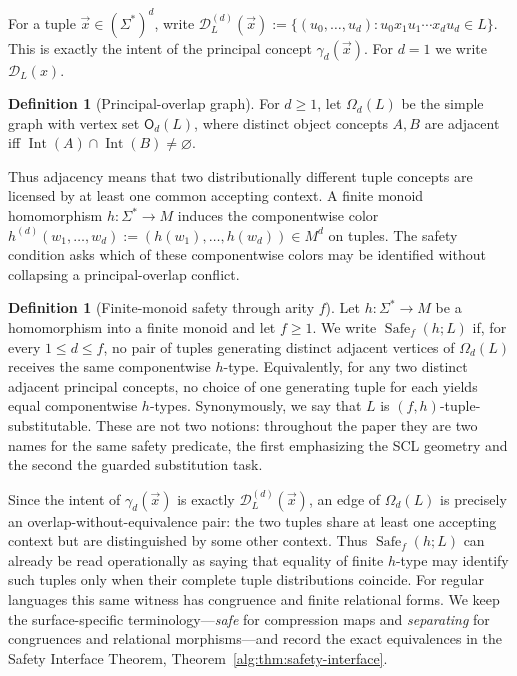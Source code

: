 \documentclass[10pt,a4paper]{article}
\theoremstyle{definition}
\newtheorem{definition}[theorem]{Definition}
\theoremstyle{remark}
\newcommand{\D}{\mathcal D}
\newcommand{\Obj}{\mathsf O}
\newcommand{\Om}{\Omega}
\begin{document}
For a tuple \(\vec x\in(\Sigma^*)^d\), write
\(
 \D_L^{(d)}(\vec x):=\{(u_0,\ldots,u_d):u_0x_1u_1\cdots x_du_d\in L\}.
\)
This is exactly the intent of the principal concept \(\gamma_d(\vec x)\).
For \(d=1\) we write \(\D_L(x)\).

\begin{definition}[Principal-overlap graph]
For \(d\ge1\), let \(\Om_d(L)\) be the simple graph with vertex set
\(\Obj_d(L)\), where distinct object concepts \(A,B\) are adjacent iff
\(
 \operatorname{Int}(A)\cap\operatorname{Int}(B)\ne\varnothing.
\)
\end{definition}

Thus adjacency means that two distributionally different tuple concepts are
licensed by at least one common accepting context.  A finite monoid
homomorphism \(h:\Sigma^*\to M\) induces the componentwise color
\(h^{(d)}(w_1,\ldots,w_d):=(h(w_1),\ldots,h(w_d))\in M^d\)
on tuples.  The safety condition asks which of these componentwise colors may
be identified without collapsing a principal-overlap conflict.

\begin{definition}[Finite-monoid safety through arity \(f\)]
\label{scl:def:safety}
Let \(h:\Sigma^*\to M\) be a homomorphism into a finite monoid and let
\(f\ge1\).  We write
\(\operatorname{Safe}_f(h;L)\)
if, for every \(1\le d\le f\), no pair of tuples generating distinct
adjacent vertices of \(\Om_d(L)\) receives the same componentwise
\(h\)-type.  Equivalently, for any two distinct adjacent principal concepts,
no choice of one generating tuple for each yields equal componentwise
\(h\)-types.
Synonymously, we say that \(L\) is \((f,h)\)-tuple-substitutable.  These are
not two notions: throughout the paper they are two names for the same safety
predicate, the first emphasizing the SCL geometry and the second the guarded
substitution task.
\end{definition}

Since the intent of \(\gamma_d(\vec x)\) is exactly
\(\D_L^{(d)}(\vec x)\), an edge of \(\Om_d(L)\) is precisely an
overlap-without-equivalence pair: the two tuples share at least one accepting
context but are distinguished by some other context.  Thus
\(\operatorname{Safe}_f(h;L)\) can already be read operationally as saying
that equality of finite \(h\)-type may identify such tuples only when their
complete tuple distributions coincide.  For regular languages this same
witness has congruence and finite relational forms.  We keep the
surface-specific terminology---\emph{safe} for compression maps and
\emph{separating} for congruences and relational morphisms---and record the
exact equivalences in the Safety Interface Theorem,
Theorem~\ref{alg:thm:safety-interface}.
\end{document}
